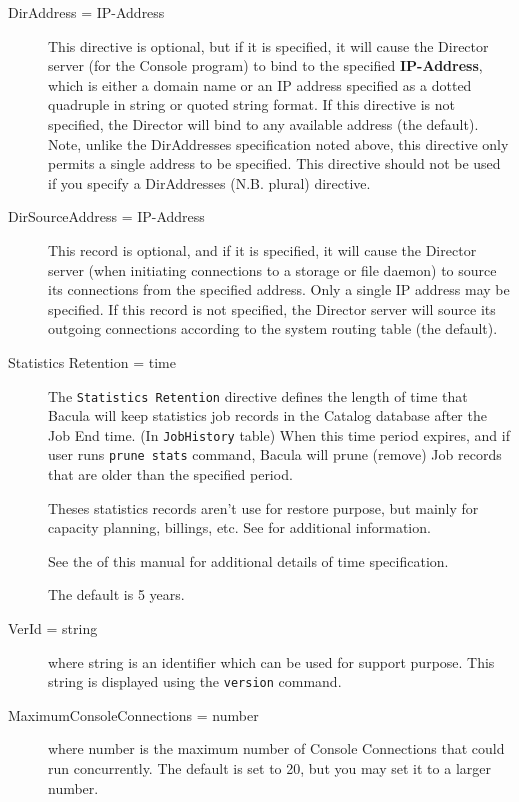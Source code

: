 \begin{description}
\item [DirAddress = \lt{}IP-Address\gt{}]
   This directive is optional, but if it is specified, it will cause the
   Director server (for the Console program) to bind to the specified {\bf
     IP-Address}, which is either a domain name or an IP address specified as a
   dotted quadruple in string or quoted string format.  If this directive is
   not specified, the Director will bind to any available address (the
   default).  Note, unlike the DirAddresses specification noted above, this
   directive only permits a single address to be specified.  This directive
   should not be used if you specify a DirAddresses (N.B. plural) directive.

\item [DirSourceAddress = \lt{}IP-Address\gt{}]
   This record is optional, and if it is specified, it will cause the Director
   server (when initiating connections to a storage or file daemon) to source
   its connections from the specified address.  Only a single IP address may be
   specified.  If this record is not specified, the Director server will source
   its outgoing connections according to the system routing table (the default).

\item[Statistics Retention = \lt{}time\gt{}]
   \label{PruneStatistics}

   The \texttt{Statistics Retention} directive defines the length of time that
   Bacula will keep statistics job records in the Catalog database after the
   Job End time. (In \texttt{JobHistory} table) When this time period expires,
   and if user runs \texttt{prune stats} command, Bacula will prune (remove)
   Job records that are older than the specified period.

   Theses statistics records aren't use for restore purpose, but mainly for
   capacity planning, billings, etc. See  for
   additional information.

   See the  of this manual for additional
   details of time specification.

   The default is 5 years.

\item[VerId = \lt{}string\gt{}]
  where  \lt{}string\gt{} is an identifier which can be used for support purpose.
  This string is displayed using the \texttt{version} command.

\item[MaximumConsoleConnections = \lt{}number\gt{}] 
   where \lt{}number\gt{}  is the maximum number of Console Connections that
   could run  concurrently. The default is set to 20, but you may set it to a 
   larger number.

\end{description}

